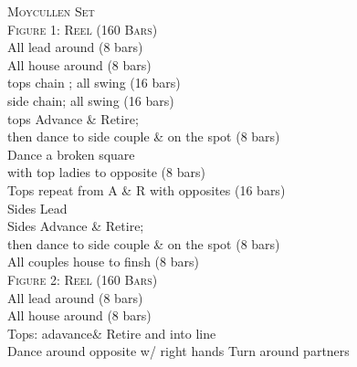 \textsc{Moycullen Set} \\


\small \textsc{Figure 1: Reel (160 Bars)}\\


\tiny
All lead around (8 bars)\\
All house around (8 bars)\\
tops chain ; all swing (16 bars)\\
side chain; all swing (16 bars)\\
tops Advance \& Retire; \\
then dance to side couple \& on the spot (8 bars)\\
Dance a broken square\\
with top ladies to opposite  (8 bars)\\
Tops repeat from A \& R with opposites (16 bars)\\
Sides Lead \\
Sides Advance \& Retire; \\
then dance to side couple \& on the spot (8 bars)\\
All couples house to finsh (8 bars)\\


\small \textsc{Figure 2: Reel (160 Bars)}\\

\tiny
All lead around (8 bars)\\
All house around (8 bars)\\
Tops: adavance\& Retire and into line\\
Dance around opposite w/ right hands
Turn around partners\\
